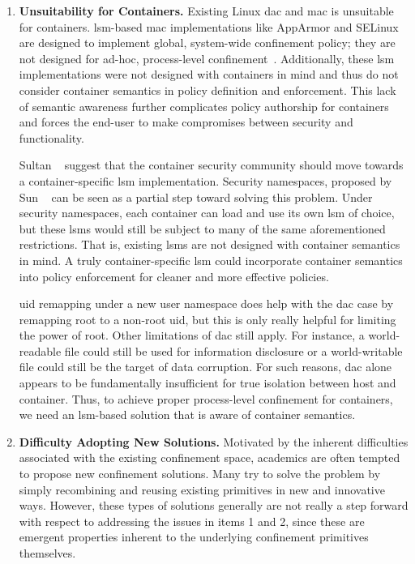 \begin{enumerate}[font=\bfseries]
  \item \label{i:problem-unsuitability} \textbf{Unsuitability for Containers.}
    Existing Linux \gls{dac} and \gls{mac} is unsuitable for containers.
    \gls{lsm}-based \gls{mac} implementations like AppArmor and SELinux are
    designed to implement global, system-wide confinement policy; they are not designed
    for ad-hoc, process-level confinement~\cite{belair2019_leveraging}. Additionally,
    these \gls{lsm} implementations were not designed with containers in mind and thus
    do not consider container semantics in policy definition and enforcement. This lack
    of semantic awareness further complicates policy authorship for containers and
    forces the end-user to make compromises between security and functionality.

    Sultan \etal~\cite{sultan2019_container_security} suggest that the container
    security community should move towards a container-specific \gls{lsm}
    implementation. Security namespaces, proposed by Sun
    \etal~\cite{sun2018_security_namespace} can be seen as a partial step toward solving
    this problem.  Under security namespaces, each container can load and use its own
    \gls{lsm} of choice, but these \glspl{lsm} would still be subject to many of the
    same aforementioned restrictions. That is, existing \glspl{lsm} are not designed
    with container semantics in mind. A truly container-specific \gls{lsm} could incorporate
    container semantics into policy enforcement for cleaner and more effective policies.

    \gls{uid} remapping under a new user namespace does help with the \gls{dac} case by
    remapping root to a non-root \gls{uid}, but this is only really helpful for limiting
    the power of root. Other limitations of \gls{dac} still apply. For instance,
    a world-readable file could still be used for information disclosure or
    a world-writable file could still be the target of data corruption. For such reasons,
    \gls{dac} alone appears to be fundamentally insufficient for true isolation between
    host and container. Thus, to achieve proper process-level confinement for containers,
    we need an \gls{lsm}-based solution that is aware of container semantics.

  \item \label{i:problem-adoptability} \textbf{Difficulty Adopting New Solutions.}
    Motivated by the inherent difficulties associated with the existing confinement space,
    academics are often tempted to propose new confinement solutions. Many try to solve
    the problem by simply recombining and reusing existing primitives in new and
    innovative ways.  However, these types of solutions generally are not really a step
    forward with respect to addressing the issues in items 1 and 2, since these are
    emergent properties inherent to the underlying confinement primitives themselves.


\end{enumerate}
